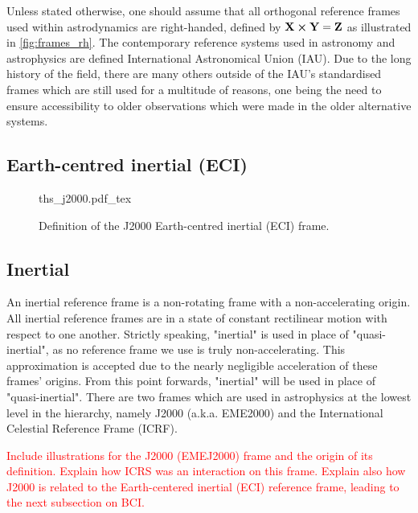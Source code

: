 Unless stated otherwise, one should assume that all orthogonal reference frames used within astrodynamics are right-handed, defined by $\mathbf{X}\cross{\mathbf{Y}}=\mathbf{Z}$ as illustrated in \autoref{fig:frames_rh}. The contemporary reference systems used in astronomy and astrophysics are defined International Astronomical Union (IAU). Due to the long history of the field, there are many others outside of the IAU's standardised frames which are still used for a multitude of reasons, one being the need to ensure accessibility to older observations which were made in the older alternative systems.

\subsection{Earth-centred inertial (ECI)\label{ssec:frame_intertial}}

\begin{figure}[h]
    \centering
    \def\svgwidth{0.75\linewidth}
    {ths_j2000.pdf_tex}
    \caption{Definition of the J2000 Earth-centred inertial (ECI) frame.}
    \label{fig:my_label}
\end{figure}

\subsection{Inertial\label{ssec:frame_intertial}}

An inertial reference frame is a non-rotating frame with a non-accelerating origin. All inertial reference frames are in a state of constant rectilinear motion with respect to one another. Strictly speaking, "inertial" is used in place of "quasi-inertial", as no reference frame we use is truly non-accelerating. This approximation is accepted due to the nearly negligible acceleration of these frames' origins. From this point forwards, "inertial" will be used in place of "quasi-inertial". There are two frames which are used in astrophysics at the lowest level in the hierarchy, namely J2000 (a.k.a. EME2000) and the International Celestial Reference Frame (ICRF).

\textcolor{red}{Include illustrations for the J2000 (EMEJ2000) frame and the
origin of its definition. Explain how ICRS was an interaction on this frame.
Explain also how J2000 is related to the Earth-centered inertial (ECI) reference
frame, leading to the next subsection on BCI.}

